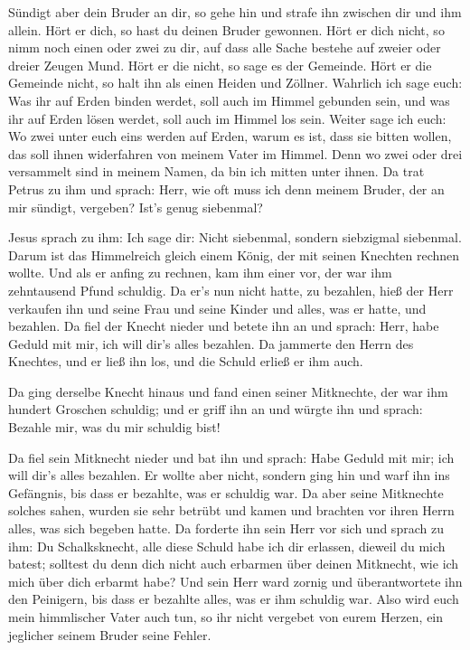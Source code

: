  Sündigt aber dein Bruder an dir, so gehe hin und strafe
ihn zwischen dir und ihm allein. Hört er dich, so hast du deinen Bruder
gewonnen.  Hört er dich nicht, so nimm noch einen oder
zwei zu dir, auf dass alle Sache bestehe auf zweier oder dreier Zeugen
Mund.  Hört er die nicht, so sage es der Gemeinde. Hört
er die Gemeinde nicht, so halt ihn als einen Heiden und Zöllner.
 Wahrlich ich sage euch: Was ihr auf Erden binden werdet,
soll auch im Himmel gebunden sein, und was ihr auf Erden lösen werdet,
soll auch im Himmel los sein.  Weiter sage ich euch: Wo
zwei unter euch eins werden auf Erden, warum es ist, dass sie bitten
wollen, das soll ihnen widerfahren von meinem Vater im Himmel.
 Denn wo zwei oder drei versammelt sind in meinem Namen,
da bin ich mitten unter ihnen.  Da trat Petrus zu ihm und
sprach: Herr, wie oft muss ich denn meinem Bruder, der an mir sündigt,
vergeben? Ist's genug siebenmal?

 Jesus sprach zu ihm: Ich sage dir: Nicht siebenmal,
sondern siebzigmal siebenmal.  Darum ist das Himmelreich
gleich einem König, der mit seinen Knechten rechnen wollte.
 Und als er anfing zu rechnen, kam ihm einer vor, der war
ihm zehntausend Pfund schuldig.  Da er's nun nicht hatte,
zu bezahlen, hieß der Herr verkaufen ihn und seine Frau und seine Kinder
und alles, was er hatte, und bezahlen.  Da fiel der
Knecht nieder und betete ihn an und sprach: Herr, habe Geduld mit mir,
ich will dir's alles bezahlen.  Da jammerte den Herrn des
Knechtes, und er ließ ihn los, und die Schuld erließ er ihm auch.

 Da ging derselbe Knecht hinaus und fand einen seiner
Mitknechte, der war ihm hundert Groschen schuldig; und er griff ihn an
und würgte ihn und sprach: Bezahle mir, was du mir schuldig bist!

 Da fiel sein Mitknecht nieder und bat ihn und sprach:
Habe Geduld mit mir; ich will dir's alles bezahlen.  Er
wollte aber nicht, sondern ging hin und warf ihn ins Gefängnis, bis dass
er bezahlte, was er schuldig war.  Da aber seine
Mitknechte solches sahen, wurden sie sehr betrübt und kamen und brachten
vor ihren Herrn alles, was sich begeben hatte.  Da
forderte ihn sein Herr vor sich und sprach zu ihm: Du Schalksknecht,
alle diese Schuld habe ich dir erlassen, dieweil du mich batest;
 solltest du denn dich nicht auch erbarmen über deinen
Mitknecht, wie ich mich über dich erbarmt habe?  Und sein
Herr ward zornig und überantwortete ihn den Peinigern, bis dass er
bezahlte alles, was er ihm schuldig war.  Also wird euch
mein himmlischer Vater auch tun, so ihr nicht vergebet von eurem Herzen,
ein jeglicher seinem Bruder seine Fehler.

